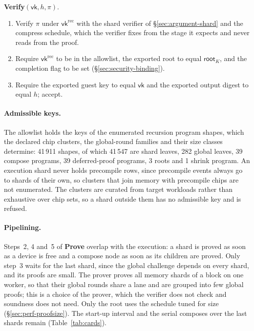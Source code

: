\begin{protocol}
\noindent\textbf{Verify}$(\mathsf{vk}, h, \pi)$.
\begin{enumerate}
  \item Verify $\pi$ under $\mathsf{vk}^{\mathrm{rec}}$ with the shard verifier of \S\ref{sec:argument-shard} and the compress schedule, which the verifier fixes from the stage it expects and never reads from the proof.
  \item Require $\mathsf{vk}^{\mathrm{rec}}$ to be in the allowlist, the exported root to equal $\mathsf{root}_K$, and the completion flag to be set (\S\ref{sec:security-binding}).
  \item Require the exported guest key to equal $\mathsf{vk}$ and the exported output digest to equal $h$; accept.
\end{enumerate}
\end{protocol}

\paragraph{Admissible keys.} The allowlist holds the keys of the enumerated recursion program shapes, which the declared chip clusters, the global-round families and their size classes determine: 41\,911 shapes, of which 41\,547 are shard leaves, 282 global leaves, 39 compose programs, 39 deferred-proof programs, 3 roots and 1 shrink program. An execution shard never holds precompile rows, since precompile events always go to shards of their own, so clusters that join memory with precompile chips are not enumerated. The clusters are curated from target workloads rather than exhaustive over chip sets, so a shard outside them has no admissible key and is refused.

\paragraph{Pipelining.}\label{sec:perf-pipeline} Steps~2, 4 and~5 of \textbf{Prove} overlap with the execution: a shard is proved as soon as a device is free and a compose node as soon as its children are proved. Only step~3 waits for the last shard, since the global challenge depends on every shard, and its proofs are small. The prover proves all memory shards of a block on one worker, so that their global rounds share a lane and are grouped into few global proofs; this is a choice of the prover, which the verifier does not check and soundness does not need. Only the root uses the schedule tuned for size (\S\ref{sec:perf-proofsize}). The start-up interval and the serial composes over the last shards remain (Table~\ref{tab:cards}).

